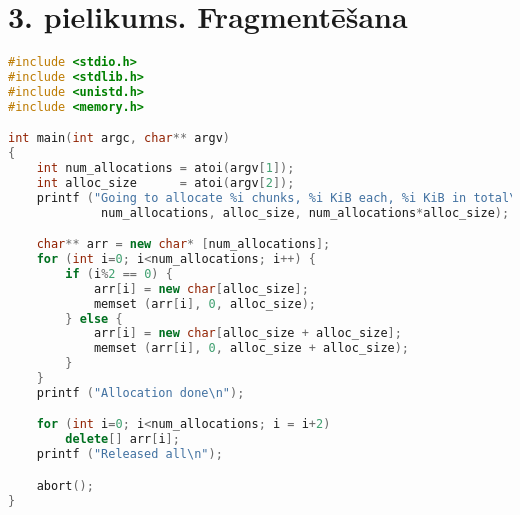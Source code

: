 \newpage
\chapter{3. pielikums. Fragmentēšana}

\begin{lstlisting}[language=C++]
#include <stdio.h>
#include <stdlib.h>
#include <unistd.h>
#include <memory.h>

int main(int argc, char** argv)
{
	int num_allocations = atoi(argv[1]);
	int alloc_size      = atoi(argv[2]);
	printf ("Going to allocate %i chunks, %i KiB each, %i KiB in total\n",
	         num_allocations, alloc_size, num_allocations*alloc_size);

	char** arr = new char* [num_allocations];
	for (int i=0; i<num_allocations; i++) {
		if (i%2 == 0) {
			arr[i] = new char[alloc_size];
			memset (arr[i], 0, alloc_size);
		} else {
			arr[i] = new char[alloc_size + alloc_size];
			memset (arr[i], 0, alloc_size + alloc_size);
		}
	}
	printf ("Allocation done\n");

	for (int i=0; i<num_allocations; i = i+2)
		delete[] arr[i];
	printf ("Released all\n");

	abort();
} 
\end{lstlisting}


